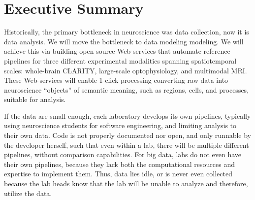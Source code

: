 \section{Executive Summary}





Historically, the primary bottleneck in neuroscience was data collection, now it is data analysis.  We will move the bottleneck to data modeling modeling.  We will achieve this via building open source Web-services that automate reference pipelines for three different experimental modalities spanning spatiotemporal scales: whole-brain CLARITY, large-scale optophysiology, and multimodal MRI. These Web-services will enable 1-click processing converting raw data into neuroscience ``objects'' of semantic meaning, such as regions, cells, and processes, suitable for analysis.  



If the data are small enough,  each laboratory develops its own pipelines, typically using neuroscience students for software engineering, and limiting analysis to their own data.  
Code is not properly documented nor open, and only runnable by the developer herself,  such that even within a lab, there will be multiple different pipelines, without comparison capabilities. For big data, labs do not even have their own pipelines, because they lack both the computational resources and expertise to implement them. Thus, data lies idle, or is never even collected because the lab heads know that the lab will be unable to analyze and therefore, utilize the data.



